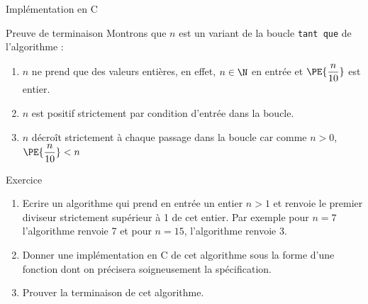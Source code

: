 \documentclass[10pt,french]{beamer}
\begin{document}
\begin{frame}{\Ctitle}{\stitle}
	\begin{exampleblock}{Implémentation en C}
	\end{exampleblock}
\end{frame}

\begin{frame}{\Ctitle}{\stitle}
	\begin{exampleblock}{Preuve de terminaison}
		Montrons que $n$ est un variant de la boucle {\tt tant que} de l'algorithme :
		\begin{enumerate}
		\item<1-> $n$ ne prend que des valeurs entières, en effet, $n \in \N$  en entrée et $\PE{\dfrac{n}{10}}$ est entier.
		\item<2-> $n$ est positif strictement par condition d'entrée dans la boucle. 
		\item<3-> $n$ décroît strictement à chaque passage dans la boucle car comme $n > 0$, $\PE{\dfrac{n}{10}} < n$
		\end{enumerate}
	\end{exampleblock}
\end{frame}

\begin{frame}{\Ctitle}{\stitle}
	\begin{exampleblock}{Exercice}
		\begin{enumerate}
		\item<1-> Ecrire un algorithme qui prend en entrée un entier $n>1$ et renvoie le premier diviseur strictement supérieur à 1 de cet entier. Par exemple pour $n=7$ l'algorithme renvoie 7 et pour $n=15$, l'algorithme renvoie $3$.
		\item<2-> Donner une implémentation en C de cet algorithme sous la forme d'une fonction dont on précisera soigneusement la spécification.
		\item<3-> Prouver la terminaison de cet algorithme.
		\end{enumerate}
	\end{exampleblock}
\end{frame}
\end{document}
